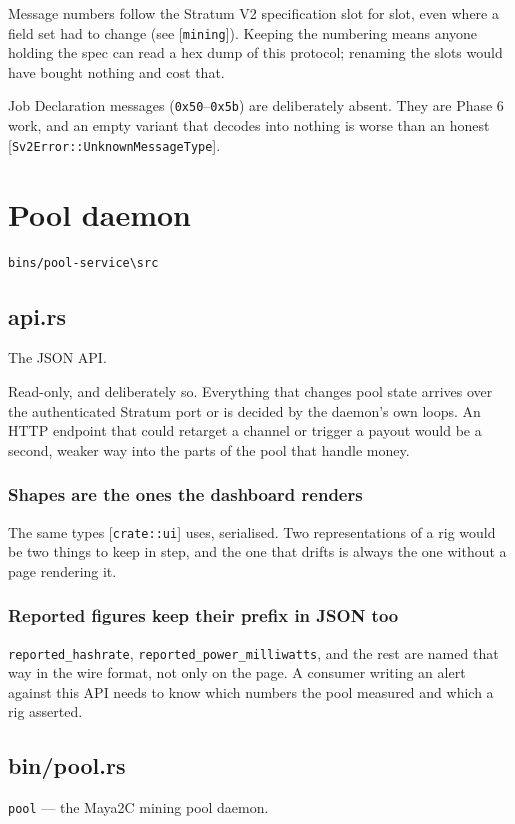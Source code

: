 \documentclass[11pt,a4paper]{article}
\begin{document}
Message numbers follow the Stratum V2 specification slot for slot, even
where a field set had to change (see [\texttt{mining}]). Keeping the numbering
means anyone holding the spec can read a hex dump of this protocol; renaming
the slots would have bought nothing and cost that.

Job Declaration messages (\texttt{0x50}–\texttt{0x5b}) are deliberately absent. They are
Phase 6 work, and an empty variant that decodes into nothing is worse than
an honest [\texttt{Sv2Error::UnknownMessageType}].

\section{Pool daemon}
\noindent\texttt{bins/pool-service\textbackslash{}src}

\subsection{api.rs}
The JSON API.

Read-only, and deliberately so. Everything that changes pool state arrives
over the authenticated Stratum port or is decided by the daemon's own loops.
An HTTP endpoint that could retarget a channel or trigger a payout would be
a second, weaker way into the parts of the pool that handle money.

\subsubsection{Shapes are the ones the dashboard renders}

The same types [\texttt{crate::ui}] uses, serialised. Two representations of a rig
would be two things to keep in step, and the one that drifts is always the
one without a page rendering it.

\subsubsection{Reported figures keep their prefix in JSON too}

\texttt{reported\_hashrate}, \texttt{reported\_power\_milliwatts}, and the rest are named
that way in the wire format, not only on the page. A consumer writing an
alert against this API needs to know which numbers the pool measured and
which a rig asserted.

\subsection{bin/pool.rs}
\texttt{pool} — the Maya2C mining pool daemon.
\end{document}
